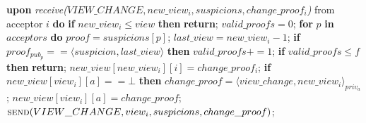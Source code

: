 \begin{algorithm}
\begin{algorithmic}[1]
		\State\textbf{upon} \textit{receive($VIEW\_CHANGE, new\_view_i, suspicions, change\_proof_i$)} from acceptor $i$ \textbf{do} 
		\State\hspace{\algorithmicindent} \textbf{if} $new\_view_i \leq view$ \textbf{then}
		\State\hspace{\algorithmicindent}\hspace{\algorithmicindent}\textbf{return};
		\State
		\State\hspace{\algorithmicindent} $valid\_proofs = 0$;
		\State\hspace{\algorithmicindent} \textbf{for} $p$ \textbf{in} $acceptors$ \textbf{do} 
		\State\hspace{\algorithmicindent}\hspace{\algorithmicindent} $proof = suspicions[p]$;
		\State\hspace{\algorithmicindent}\hspace{\algorithmicindent} $last\_view = new\_view_i-1$;
		\State\hspace{\algorithmicindent}\hspace{\algorithmicindent} \textbf{if} $proof_{pub_p} == \langle suspicion, last\_view \rangle$ \textbf{then}
		\State\hspace{\algorithmicindent}\hspace{\algorithmicindent}\hspace{\algorithmicindent} $valid\_proofs \mathrel{+{=}} 1$;
		\State
		\State\hspace{\algorithmicindent} \textbf{if} $valid\_proofs \leq f$ \textbf{then}
		\State\hspace{\algorithmicindent}\hspace{\algorithmicindent} \textbf{return};
		\State
		\State\hspace{\algorithmicindent} $new\_view[new\_view_i][i] = change\_proof_i$;
		\State\hspace{\algorithmicindent} \textbf{if} $new\_view[view_i][a] == \bot$ \textbf{then}				
		\State\hspace{\algorithmicindent}\hspace{\algorithmicindent} $change\_proof = \langle view\_change, new\_view_i \rangle_{priv_a}$;
		\State\hspace{\algorithmicindent}\hspace{\algorithmicindent} $new\_view[view_i][a] = change\_proof$;
		\State\hspace{\algorithmicindent}\hspace{\algorithmicindent}  $\Call{send}{VIEW\_CHANGE, view_i, suspicions, change\_proof}$;

\end{algorithmic}
\end{algorithm}
